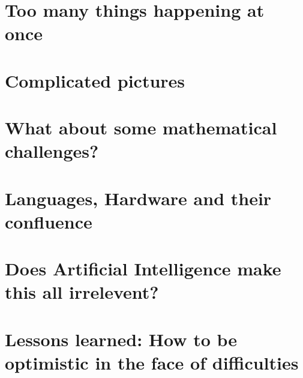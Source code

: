 \chapter{Too many things happening at once}




\chapter{Complicated pictures}




\chapter{What about some mathematical challenges?}


\chapter{Languages, Hardware and their confluence}



\chapter{Does Artificial Intelligence make this all irrelevent?}


\chapter{Lessons learned: How to be optimistic in the face of difficulties}



